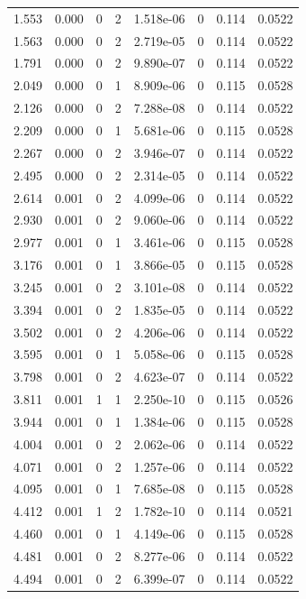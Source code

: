 \documentclass[preview]{standalone}
\begin{document}
{{\begin{tabular}{L{1.2cm}C{1.2cm} C{0.3cm}C{0.5cm} C{1.4cm}C{1.4cm} C{1.4cm}C{1.4cm}}
  1.553  &  0.000  & 0     &  2 &  1.518e-06  & 0  & 0.114 &  0.0522   \\ 
  1.563  &  0.000  & 0     &  2 &  2.719e-05  & 0  & 0.114 &  0.0522   \\ 
  1.791  &  0.000  & 0     &  2 &  9.890e-07  & 0  & 0.114 &  0.0522   \\ 
  2.049  &  0.000  & 0     &  1 &  8.909e-06  & 0  & 0.115 &  0.0528   \\ 
  2.126  &  0.000  & 0     &  2 &  7.288e-08  & 0  & 0.114 &  0.0522   \\ 
  2.209  &  0.000  & 0     &  1 &  5.681e-06  & 0  & 0.115 &  0.0528   \\ 
  2.267  &  0.000  & 0     &  2 &  3.946e-07  & 0  & 0.114 &  0.0522   \\ 
  2.495  &  0.000  & 0     &  2 &  2.314e-05  & 0  & 0.114 &  0.0522   \\ 
  2.614  &  0.001  & 0     &  2 &  4.099e-06  & 0  & 0.114 &  0.0522   \\ 
  2.930  &  0.001  & 0     &  2 &  9.060e-06  & 0  & 0.114 &  0.0522   \\ 
  2.977  &  0.001  & 0     &  1 &  3.461e-06  & 0  & 0.115 &  0.0528   \\ 
  3.176  &  0.001  & 0     &  1 &  3.866e-05  & 0  & 0.115 &  0.0528   \\ 
  3.245  &  0.001  & 0     &  2 &  3.101e-08  & 0  & 0.114 &  0.0522   \\ 
  3.394  &  0.001  & 0     &  2 &  1.835e-05  & 0  & 0.114 &  0.0522   \\ 
  3.502  &  0.001  & 0     &  2 &  4.206e-06  & 0  & 0.114 &  0.0522   \\ 
  3.595  &  0.001  & 0     &  1 &  5.058e-06  & 0  & 0.115 &  0.0528   \\ 
  3.798  &  0.001  & 0     &  2 &  4.623e-07  & 0  & 0.114 &  0.0522   \\ 
  3.811  &  0.001  & 1     &  1 &  2.250e-10  & 0  & 0.115 &  0.0526   \\ 
  3.944  &  0.001  & 0     &  1 &  1.384e-06  & 0  & 0.115 &  0.0528   \\ 
  4.004  &  0.001  & 0     &  2 &  2.062e-06  & 0  & 0.114 &  0.0522   \\ 
  4.071  &  0.001  & 0     &  2 &  1.257e-06  & 0  & 0.114 &  0.0522   \\ 
  4.095  &  0.001  & 0     &  1 &  7.685e-08  & 0  & 0.115 &  0.0528   \\ 
  4.412  &  0.001  & 1     &  2 &  1.782e-10  & 0  & 0.114 &  0.0521   \\ 
  4.460  &  0.001  & 0     &  1 &  4.149e-06  & 0  & 0.115 &  0.0528   \\ 
  4.481  &  0.001  & 0     &  2 &  8.277e-06  & 0  & 0.114 &  0.0522   \\ 
  4.494  &  0.001  & 0     &  2 &  6.399e-07  & 0  & 0.114 &  0.0522   \\ 
\hline 
\end{tabular} 

}}
\end{document}
